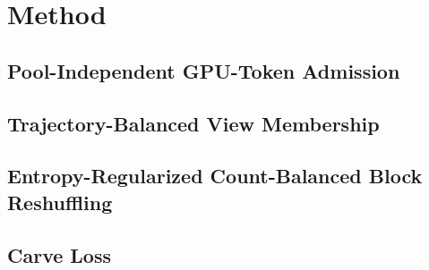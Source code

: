 
\section{Method}
\label{sec:method}
\subsection{Pool-Independent GPU-Token Admission}
\label{sec:admission}
\subsection{Trajectory-Balanced View Membership}
\label{sec:membership}
\TODO{}
\subsection{Entropy-Regularized Count-Balanced Block Reshuffling}
\label{sec:ercb}
\subsection{Carve Loss}
\label{sec:carve}
